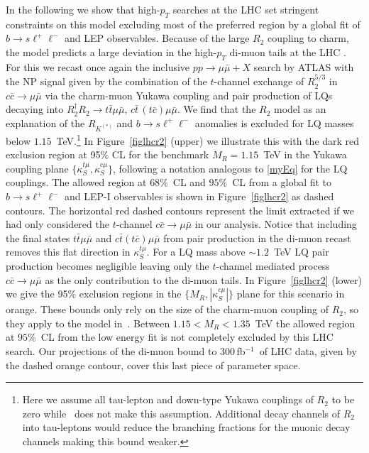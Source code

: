 \documentclass[aps,twocolumn,showpacs,preprintnumbers,amsmath,amssymb,floatfix,nofootinbib]{revtex4-1}
\newcommand{\invfb}{fb$^{-1}$}
\begin{document}
In the following we show that high-$p_T$ searches at the LHC set stringent constraints on this model excluding most of the preferred region by a global fit of $b \to s \ell^+ \ell^-$ and LEP observables. Because of the large $R_2$ coupling to charm, the model predicts a large deviation in the high-$p_T$ di-muon tails at the LHC \cite{Greljo:2017vvb}. For this we recast once again the inclusive $pp \to \mu\bar\mu+X$ search by ATLAS \cite{Aaboud:2017buh} with the NP signal given by the combination of the $t$-channel exchange of $R_2^{5/3}$ in $c\bar c\to \mu\bar\mu$ via the charm-muon Yukawa coupling and pair production of LQs decaying into $R_2^{\dagger} R_2\to t\bar t\mu\bar\mu,\, c\bar t\,(t\bar c)\mu\bar\mu$. We find that the $R_2$ model as an explanation of the $R_{K^{(*)}}$ and  $b \to s \ell^+ \ell^- $ anomalies is excluded for LQ masses below $1.15$~TeV.\footnote{Here we assume all tau-lepton and down-type Yukawa couplings of $R_2$ to be zero while~\cite{Becirevic:2017jtw} does not make this assumption. Additional decay channels of $R_2$ into tau-leptons would reduce the branching fractions for the muonic decay channels making this bound weaker.} In Figure~\ref{figlhcr2} (upper) we illustrate this with the dark red exclusion region at 95$\%$ CL for the benchmark $M_R=1.15$~TeV in the Yukawa coupling plane $\{\kappa_S^{t \mu},\kappa_S^{c \mu}\}$, following a notation analogous to \eqref{myEq} for the LQ couplings. The allowed region at $68\%$~CL and $95\%$~CL from a global fit to $b \to s \ell^+ \ell^- $ and LEP-I observables is shown in Figure~\ref{figlhcr2} as dashed contours. The horizontal red dashed contours represent the limit extracted if we had only considered the $t$-channel $c\bar c\to\mu\bar\mu$ in our analysis. Notice that including the final states $t\bar t\mu\bar\mu$ and $c\bar t(t\bar c)\mu\bar\mu$ from pair production in the di-muon recast removes this flat direction in $\kappa_S^{t \mu}$. For a LQ mass above $\sim1.2$~TeV LQ pair production becomes negligible leaving only the $t$-channel mediated process $c\bar c\to\mu\bar\mu$ as the only contribution to the di-muon tails. In Figure~\ref{figlhcr2} (lower) we give the 95\% exclusion regions in the $\{M_{R},|\kappa_S^{c \mu}|\}$ plane for this scenario in orange. These bounds only rely on the size of the charm-muon coupling of $R_2$, so they apply to the model in~\cite{Becirevic:2017jtw}.  Between $1.15<M_R< 1.35$~TeV the allowed region at $95\%$~CL from the low energy fit is not completely excluded by this LHC search. Our projections of the di-muon bound to 300\,\invfb~of LHC data, given by the dashed orange contour, cover this last piece of parameter space. 
\end{document}
